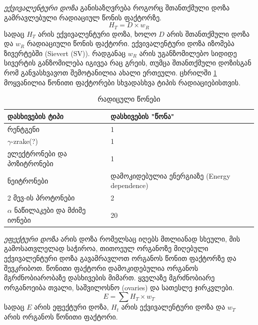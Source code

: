 \documentclass[12pt,a4paper,]{report}
\begin{document}
\textit{ექვივალენტური დოზა} განისაზღვრება როგორც შთანთქმული დოზა გამრავლებული რადიაციულ წონის ფაქტორზე.
	\begin{equation}
		H_T = D \times w_R
	\end{equation}
სადაც $H_T$ არის ექვივალენტური დოზა, ხოლო $D$ არის შთანთქმული დოზა და $w_R$ რადიაციული წონის ფაქტორი. ექვივალენტური დოზა იზომება ზივერტებში (Sievert (SV)). რადგანაც $w_R$ არის უგანზომილებო სიდიდე სივერტის განზომილება იგივეა რაც გრეის, თუმცა შთანთქმული დოზისგან რომ განვასხვავოთ შემოტანილია ახალი ერთეული. ცხრილში \ref{tab:rad_weight_factor} მოყვანილია წონითი ფაქტორები სხვადასხვა ტიპის რადიაციებისთვის. 
    \begin{table}[h]
        \centering
        \begin{tabular}{l | l}
             დასხივების ტიპი & დასხივების "წონა" \\
             \hline
             \hline
             რენტგენი & 1 \\
             $\gamma$-zrake(?) & 1 \\
             ელექტრონები და პოზიტრონები & 1 \\
             ნეიტრონები & დამოკიდებულია ენერგიაზე (Energy dependence) \\
             2 მევ-ის პროტონები & 2 \\
             $\alpha$ ნაწილაკები და მძიმე იონები & 20 \\
        \end{tabular}
        \caption{რადიცული წონები}
        \label{tab:rad_weight_factor}
    \end{table}
\textit{ეფექტური დოზა} არის დოზა რომელსაც იღებს მთლიანად სხეული, მის გამოსათვლელად საჭიროა, თითოეულ ორგანოზე მიღებული ექვივალენტური დოზა გავამრავლოთ ორგანოს წონით ფაქტორზე და შევკრიბოთ. წონითი ფაქტორი დამოკიდებულია ორგანოს მგრძნობიარობაზე დასხივების მიმართ. ყველაზე მგრძნობიარე ორგანოეიბა თვალი, საშვილოსნო (ovaries) და სათესლე ჯირკვლები.
	\begin{equation}
		E = \sum H_T \times w_T
	\end{equation}
სადაც $E$ არის ეფექტური დოზა,  $H_t$ არის ექვივალენტური დოზა და $w_T$ არის ორგანოს წონითი ფაქტორი. 
\end{document}
